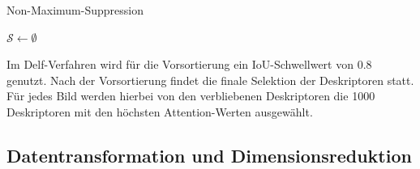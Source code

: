 \begin{algorithm}
\caption{Non-Maximum-Suppression}
\label{nms}
\DontPrintSemicolon
{}
$\mathcal{S} \leftarrow \emptyset$ \;

\end{algorithm}
Im Delf-Verfahren wird für die Vorsortierung ein IoU-Schwellwert von $0.8$ genutzt. Nach der Vorsortierung findet die finale Selektion der Deskriptoren statt. Für jedes Bild werden hierbei von den verbliebenen Deskriptoren die 1000 Deskriptoren mit den höchsten Attention-Werten ausgewählt.

\subsection{Datentransformation und Dimensionsreduktion}

